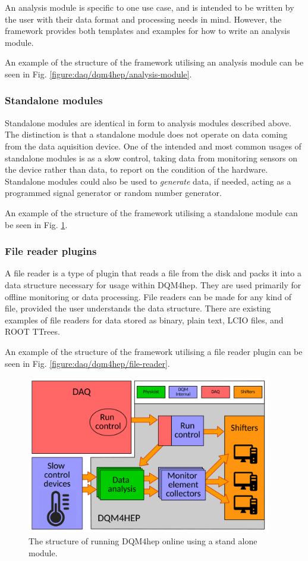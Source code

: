 An analysis module is specific to one use case, and is intended to be written by the user with their data format and processing needs in mind. However, the framework provides both templates and examples for how to write an analysis module. 

An example of the structure of the framework utilising an analysis module can be seen in Fig. \ref{figure:daq/dqm4hep/analysis-module}.

\subsubsection{Standalone modules}
Standalone modules are identical in form to analysis modules described above. The distinction is that a standalone module does not operate on data coming from the data aquisition device. One of the intended and most common usages of standalone modules is as a slow control, taking data from monitoring sensors on the device rather than data, to report on the condition of the hardware. Standalone modules could also be used to \emph{generate} data, if needed, acting as a programmed signal generator or random number generator. 

An example of the structure of the framework utilising a standalone module can be seen in Fig. \ref{figure:daq/dqm4hep/standalone-module}.

\subsubsection{File reader plugins}
A file reader is a type of plugin that reads a file from the disk and packs it into a data structure necessary for usage within DQM4hep. They are used primarily for offline monitoring or data processing. File readers can be made for any kind of file, provided the user understands the data structure. There are existing examples of file readers for data stored as binary, plain text, LCIO files, and ROOT TTrees. 

An example of the structure of the framework utilising a file reader plugin can be seen in Fig. \ref{figure:daq/dqm4hep/file-reader}.

\begin{figure}[p]
	\centering
	\includegraphics[width=0.95\textwidth]{../Pictures/StandaloneModuleArchitecture.pdf}
	\caption{The structure of running DQM4hep online using a stand alone module.}
	\label{figure:daq/dqm4hep/standalone-module}
\end{figure}

